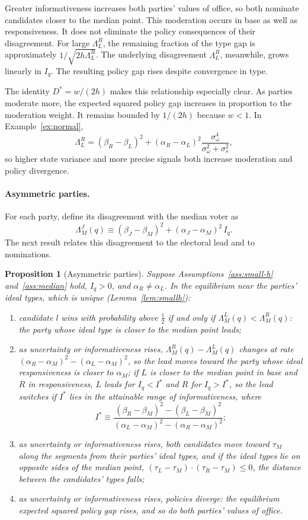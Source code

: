 \documentclass[12pt,letterpaper]{article}
\newtheorem{proposition}{Proposition}
\begin{document}
Greater informativeness increases both parties' values of office, so both nominate candidates closer to the median point. This moderation occurs in base as well as responsiveness. It does not eliminate the policy consequences of their disagreement. For large $\Lambda_L^R$, the remaining fraction of the type gap is approximately $1/\sqrt{2h\Lambda_L^R}$. The underlying disagreement $\Lambda_L^R$, meanwhile, grows linearly in $I_q$. The resulting policy gap rises despite convergence in type.

The identity $D^*=w/(2h)$ makes this relationship especially clear. As parties moderate more, the expected squared policy gap increases in proportion to the moderation weight. It remains bounded by $1/(2h)$ because $w<1$. In Example~\ref{ex:normal},
\[
\Lambda_L^R=(\beta_R-\beta_L)^2+(\alpha_R-\alpha_L)^2\frac{\sigma_\omega^4}{\sigma_\omega^2+\sigma_s^2},
\]
so higher state variance and more precise signals both increase moderation and policy divergence.

\paragraph{Asymmetric parties.}
For each party, define its disagreement with the median voter as
\[
\Lambda_M^J(q)\equiv(\beta_J-\beta_M)^2+(\alpha_J-\alpha_M)^2\,I_q.
\]
The next result relates this disagreement to the electoral lead and to nominations.

\begin{proposition}[Asymmetric parties]\label{prop:asymmetric}
Suppose Assumptions~\ref{ass:small-h} and~\ref{ass:median} hold, $I_q>0$, and $\alpha_R\ne\alpha_L$. In the equilibrium near the parties' ideal types, which is unique (Lemma~\ref{lem:smallh}):
\begin{enumerate}
  \item[(a)] candidate $l$ wins with probability above $\tfrac12$ if and only if $\Lambda_M^L(q)<\Lambda_M^R(q)$: the party whose ideal type is closer to the median point leads;
  \item[(b)] as uncertainty or informativeness rises, $\Lambda_M^R(q)-\Lambda_M^L(q)$ changes at rate $(\alpha_R-\alpha_M)^2-(\alpha_L-\alpha_M)^2$, so the lead moves toward the party whose ideal responsiveness is closer to $\alpha_M$; if $L$ is closer to the median point in base and $R$ in responsiveness, $L$ leads for $I_q<I^*$ and $R$ for $I_q>I^*$, so the lead switches if $I^*$ lies in the attainable range of informativeness, where
  \[
  I^*\equiv\frac{(\beta_R-\beta_M)^2-(\beta_L-\beta_M)^2}{(\alpha_L-\alpha_M)^2-(\alpha_R-\alpha_M)^2};
  \]
  \item[(c)] as uncertainty or informativeness rises, both candidates move toward $\tau_M$ along the segments from their parties' ideal types, and if the ideal types lie on opposite sides of the median point, $(\tau_L-\tau_M)\cdot(\tau_R-\tau_M)\le0$, the distance between the candidates' types falls;
  \item[(d)] as uncertainty or informativeness rises, policies diverge: the equilibrium expected squared policy gap rises, and so do both parties' values of office.
\end{enumerate}
\end{proposition}
\end{document}
